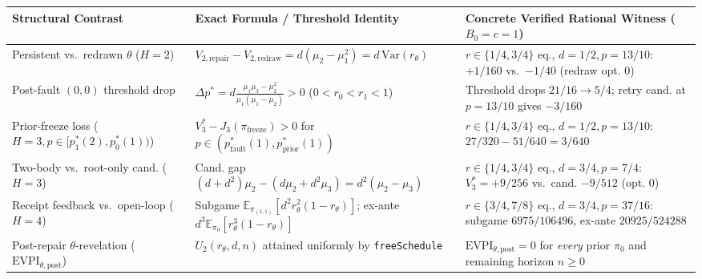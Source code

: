 \documentclass[11pt,letterpaper]{article}
\newcounter{none}
\begin{document}
{\def\LTcaptype{none} %
\begin{longtable}[]{@{}
  >{\raggedright\arraybackslash}p{}
  >{\raggedright\arraybackslash}p{}
  >{\raggedright\arraybackslash}p{}@{}}
\toprule\noalign{}
\begin{minipage}[b]{\linewidth}\raggedright
Structural Contrast
\end{minipage} & \begin{minipage}[b]{\linewidth}\raggedright
Exact Formula / Threshold Identity
\end{minipage} & \begin{minipage}[b]{\linewidth}\raggedright
Concrete Verified Rational Witness (\(B_0 = c = 1\))
\end{minipage} \\
\midrule\noalign{}
\endhead
\bottomrule\noalign{}
\endlastfoot
Persistent vs.~redrawn \(\theta\) (\(H=2\)) &
\(V_{2,\mathrm{repair}} - V_{2,\mathrm{redraw}} = d(\mu_2 - \mu_1^2) = d\,\mathrm{Var}(r_\theta)\)
& \(r \in \{1/4, 3/4\}\) eq., \(d=1/2, p=13/10\): \(+1/160\)
vs.~\(-1/40\) (redraw opt. \(0\)) \\
Post-fault \((0,0)\) threshold drop &
\(\Delta p^* = d\frac{\mu_1\mu_3 - \mu_2^2}{\mu_1(\mu_1 - \mu_2)} > 0\)
(\(0 < r_0 < r_1 < 1\)) & Threshold drops \(21/16 \to 5/4\); retry cand.
at \(p=13/10\) gives \(-3/160\) \\
Prior-freeze loss (\(H=3, p \in [p_1^*(2), p_0^*(1))\)) &
\(V_3^* - J_3(\pi_{\mathrm{freeze}}) > 0\) for
\(p \in (p_{\mathrm{fault}}^*(1), p_{\mathrm{prior}}^*(1))\) &
\(r \in \{1/4, 3/4\}\) eq., \(d=1/2, p=13/10\):
\(27/320 - 51/640 = 3/640\) \\
Two-body vs.~root-only cand. (\(H=3\)) & Cand. gap
\((d + d^2)\mu_2 - (d\mu_2 + d^2\mu_3) = d^2(\mu_2 - \mu_3)\) &
\(r \in \{1/4, 3/4\}\) eq., \(d=3/4, p=7/4\): \(V_3^* = +9/256\)
vs.~cand. \(-9/512\) (opt. \(0\)) \\
Receipt feedback vs.~open-loop (\(H=4\)) & Subgame
\(\mathbb{E}_{\pi_{(1,1)}}[d^2 r_\theta^2(1 - r_\theta)]\); ex-ante
\(d^3\mathbb{E}_{\pi_0}[r_\theta^3(1 - r_\theta)]\) &
\(r \in \{3/4, 7/8\}\) eq., \(d=3/4, p=37/16\): subgame \(6975/106496\),
ex-ante \(20925/524288\) \\
Post-repair \(\theta\)-revelation
(\(\mathrm{EVPI}_{\theta,\mathrm{post}}\)) & \(U_2(r_\theta, d, n)\)
attained uniformly by \texttt{freeSchedule} &
\(\mathrm{EVPI}_{\theta,\mathrm{post}} = 0\) for \emph{every} prior
\(\pi_0\) and remaining horizon \(n \ge 0\) \\
\end{longtable}
}
\end{document}
